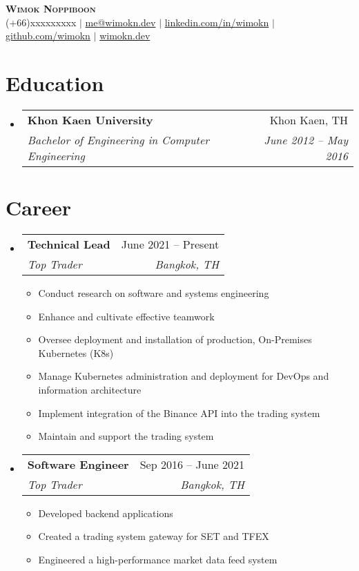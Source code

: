 \documentclass[letterpaper,11pt]{article}
\makeatletter
\newcommand{\resumeItem}[1]{
  \item\small{
    {#1 \vspace{-2pt}}
  }
}
\newcommand{\resumeSubheading}[4]{
  \vspace{-2pt}\item
    \begin{tabular*}{0.97\textwidth}[t]{l@{\extracolsep{\fill}}r}
      \textbf{#1} & #2 \\
      \textit{\small#3} & \textit{\small #4} \\
    \end{tabular*}\vspace{-7pt}
}
\newcommand{\resumeSubHeadingListStart}{\begin{itemize}[leftmargin=0.15in, label={}]}
\newcommand{\resumeSubHeadingListEnd}{\end{itemize}}
\newcommand{\resumeItemListStart}{\begin{itemize}}
\newcommand{\resumeItemListEnd}{\end{itemize}\vspace{-5pt}}
\makeatother
\begin{document}
\begin{center}
    \textbf{\Huge \scshape Wimok Noppiboon} \\ \vspace{1pt}
    \small (+66)xxxxxxxxx $|$ \href{mailto:me@wimokn.dev}{{me@wimokn.dev}} $|$ 
    \href{https://linkedin.com/in/wimokn}{{linkedin.com/in/wimokn}} $|$
    \href{https://github.com/wimokn}{{github.com/wimokn}} $|$
    \href{https://wimokn.dev}{{wimokn.dev}}
\end{center}


\section{Education}
  \resumeSubHeadingListStart
    \resumeSubheading
      {Khon Kaen University}{Khon Kaen, TH}
      {Bachelor of Engineering in Computer Engineering}{June 2012 -- May 2016}
  \resumeSubHeadingListEnd


\section{Career}
  \resumeSubHeadingListStart

    \resumeSubheading
      {Technical Lead}{June 2021 -- Present}
      {Top Trader}{Bangkok, TH}
      \resumeItemListStart    
        \resumeItem{Conduct research on software and systems engineering}
        \resumeItem{Enhance and cultivate effective teamwork}
        \resumeItem{Oversee deployment and installation of production, On-Premises Kubernetes (K8s)}
        \resumeItem{Manage Kubernetes administration and deployment for DevOps and information architecture}       
        \resumeItem{Implement integration of the Binance API into the trading system}
        \resumeItem{Maintain and support the trading system}
      \resumeItemListEnd

    \resumeSubheading
      {Software Engineer}{Sep 2016 -- June 2021}
      {Top Trader}{Bangkok, TH}
      \resumeItemListStart
        \resumeItem{Developed backend applications}
        \resumeItem{Created a trading system gateway for SET and TFEX}
        \resumeItem{Engineered a high-performance market data feed system}
    \resumeItemListEnd
  \resumeSubHeadingListEnd

\end{document}
